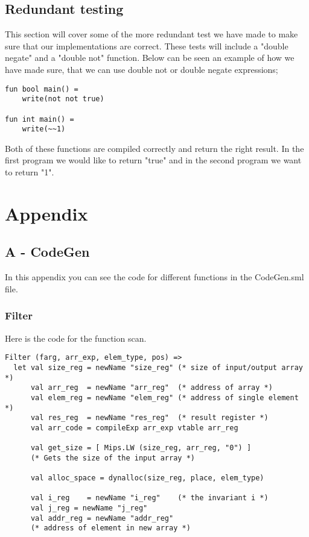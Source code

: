 \documentclass[12pt]{article}
\begin{document}
\begin{center}
\begin{center}
\subsection{Redundant testing}
This section will cover some of the more redundant test we have made to make sure that our implementations are correct. These tests will include a "double negate" and a "double not" function. Below can be seen an example of how we have made sure, that we can use double not or double negate expressions;
\begin{verbatim}
fun bool main() =
    write(not not true)
    
fun int main() =
    write(~~1)
\end{verbatim}
Both of these functions are compiled correctly and return the right result. In the first program we would like to return "true" and in the second program we want to return "1".

\pagebreak

\section{Appendix}
\subsection{A - CodeGen}
In this appendix you can see the code for different functions in the CodeGen.sml file.

\subsubsection{Filter}
Here is the code for the function scan. 

\begin{verbatim}
Filter (farg, arr_exp, elem_type, pos) =>
  let val size_reg = newName "size_reg" (* size of input/output array *)
      val arr_reg  = newName "arr_reg"  (* address of array *)
      val elem_reg = newName "elem_reg" (* address of single element *)
      val res_reg  = newName "res_reg"  (* result register *)
      val arr_code = compileExp arr_exp vtable arr_reg

      val get_size = [ Mips.LW (size_reg, arr_reg, "0") ] 
      (* Gets the size of the input array *)
      
      val alloc_space = dynalloc(size_reg, place, elem_type)

      val i_reg    = newName "i_reg"    (* the invariant i *)
      val j_reg = newName "j_reg"
      val addr_reg = newName "addr_reg" 
      (* address of element in new array *)


\end{verbatim}
\end{center}
\end{center}
\end{document}
